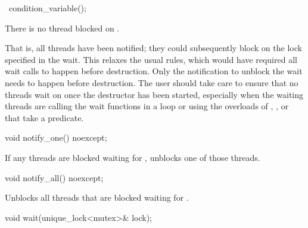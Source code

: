 %
\begin{itemdecl}
~condition_variable();
\end{itemdecl}

\begin{itemdescr}
\pnum
\expects
There is no thread blocked on .
\begin{note}
That is, all
threads have been notified; they could subsequently block on the lock specified in the
wait.
This relaxes the usual rules, which would have required all wait calls to happen before
destruction. Only the notification to unblock the wait needs to happen before destruction.
The user should take care to ensure that no threads wait on  once the destructor has
been started, especially when the waiting threads are calling the wait functions in a loop or
using the overloads of , , or  that take a predicate.
\end{note}
\end{itemdescr}

%
\begin{itemdecl}
void notify_one() noexcept;
\end{itemdecl}

\begin{itemdescr}
\pnum
\effects
If any threads are blocked waiting for , unblocks one of those threads.
\end{itemdescr}

%
\begin{itemdecl}
void notify_all() noexcept;
\end{itemdecl}

\begin{itemdescr}
\pnum
\effects
Unblocks all threads that are blocked waiting for .
\end{itemdescr}

%
\begin{itemdecl}
void wait(unique_lock<mutex>& lock);
\end{itemdecl}

